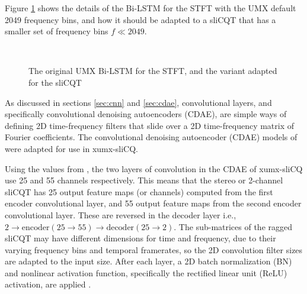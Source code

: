 \documentclass[report.tex]{subfiles}
\begin{document}
Figure \ref{fig:umxnetworkdetails} shows the details of the Bi-LSTM for the STFT with the UMX default 2049 frequency bins, and how it should be adapted to a sliCQT that has a smaller set of frequency bins $f \ll 2049$.

\begin{figure}[ht]
	\centering
	\\
	\caption{The original UMX Bi-LSTM for the STFT, and the variant adapted for the sliCQT}
	\label{fig:umxnetworkdetails}
\end{figure}

As discussed in sections \ref{sec:cnn} and \ref{sec:cdae}, convolutional layers, and specifically convolutional denoising autoencoders (CDAE), are simple ways of defining 2D time-frequency filters that slide over a 2D time-frequency matrix of Fourier coefficients. The convolutional denoising autoencoder (CDAE) models of \textcite{plumbley1, plumbley2} were adapted for use in xumx-sliCQ.

Using the values from \textcite{plumbley2}, the two layers of convolution in the CDAE of xumx-sliCQ use 25 and 55 channels respectively. This means that the stereo or 2-channel sliCQT has 25 output feature maps (or channels) computed from the first encoder convolutional layer, and 55 output feature maps from the second encoder convolutional layer. These are reversed in the decoder layer i.e., $2 \rightarrow \text{encoder}(25 \rightarrow 55) \rightarrow \text{decoder}(25 \rightarrow 2)$. The sub-matrices of the ragged sliCQT may have different dimensions for time and frequency, due to their varying frequency bins and temporal framerates, so the 2D convolution filter sizes are adapted to the input size. After each layer, a 2D batch normalization (BN) and nonlinear activation function, specifically the rectified linear unit (ReLU) activation, are applied \parencite{plumbley2}.
\end{document}
